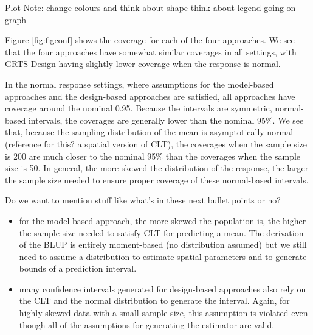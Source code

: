 \documentclass[]{elsarticle} %
\providecommand{\tightlist}{%
  \setlength{\itemsep}{0pt}\setlength{\parskip}{0pt}}
\begin{document}
Plot Note: change colours and think about shape think about legend going
on graph

Figure \ref{fig:figconf} shows the coverage for each of the four
approaches. We see that the four approaches have somewhat similar
coverages in all settings, with GRTS-Design having slightly lower
coverage when the response is normal.

In the normal response settings, where assumptions for the model-based
approaches and the design-based approaches are satisfied, all approaches
have coverage around the nominal 0.95. Because the intervals are
symmetric, normal-based intervals, the coverages are generally lower
than the nominal 95\%. We see that, because the sampling distribution of
the mean is asymptotically normal (reference for this? a spatial version
of CLT), the coverages when the sample size is 200 are much closer to
the nominal 95\% than the coverages when the sample size is 50. In
general, the more skewed the distribution of the response, the larger
the sample size needed to ensure proper coverage of these normal-based
intervals.

Do we want to mention stuff like what's in these next bullet points or
no?

\begin{itemize}
\tightlist
\item
  for the model-based approach, the more skewed the population is, the
  higher the sample size needed to satisfy CLT for predicting a mean.
  The derivation of the BLUP is entirely moment-based (no distribution
  assumed) but we still need to assume a distribution to estimate
  spatial parameters and to generate bounds of a prediction interval.
\item
  many confidence intervals generated for design-based approaches also
  rely on the CLT and the normal distribution to generate the interval.
  Again, for highly skewed data with a small sample size, this
  assumption is violated even though all of the assumptions for
  generating the estimator are valid.
\end{itemize}
\end{document}
